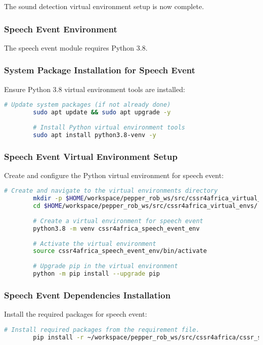 \documentclass{CSSRforAfrica}
\begin{document}
{		The sound detection virtual environment setup is now complete.
		
		\subsubsection*{Speech Event Environment}
		The speech event module requires Python 3.8.
		
		\subsubsection*{System Package Installation for Speech Event}
		Ensure Python 3.8 virtual environment tools are installed:
		\begin{lstlisting}[style=withoutNumbering, language=bash]
		# Update system packages (if not already done)
		sudo apt update && sudo apt upgrade -y
		
		# Install Python virtual environment tools
		sudo apt install python3.8-venv -y
		\end{lstlisting}
		
		\subsubsection*{Speech Event Virtual Environment Setup}
		Create and configure the Python virtual environment for speech event:
		\begin{lstlisting}[style=withoutNumbering, language=bash]
		# Create and navigate to the virtual environments directory
		mkdir -p $HOME/workspace/pepper_rob_ws/src/cssr4africa_virtual_envs/
		cd $HOME/workspace/pepper_rob_ws/src/cssr4africa_virtual_envs/
		
		# Create a virtual environment for speech event
		python3.8 -m venv cssr4africa_speech_event_env
		
		# Activate the virtual environment
		source cssr4africa_speech_event_env/bin/activate
		
		# Upgrade pip in the virtual environment
		python -m pip install --upgrade pip
		\end{lstlisting}
		
		\subsubsection*{Speech Event Dependencies Installation}
		Install the required packages for speech event:
		\begin{lstlisting}[style=withoutNumbering, language=bash]
		# Install required packages from the requirement file.
		pip install -r ~/workspace/pepper_rob_ws/src/cssr4africa/cssr_system/speech_event/speech_event_requirements.txt
		\end{lstlisting}
		
}
\end{document}
